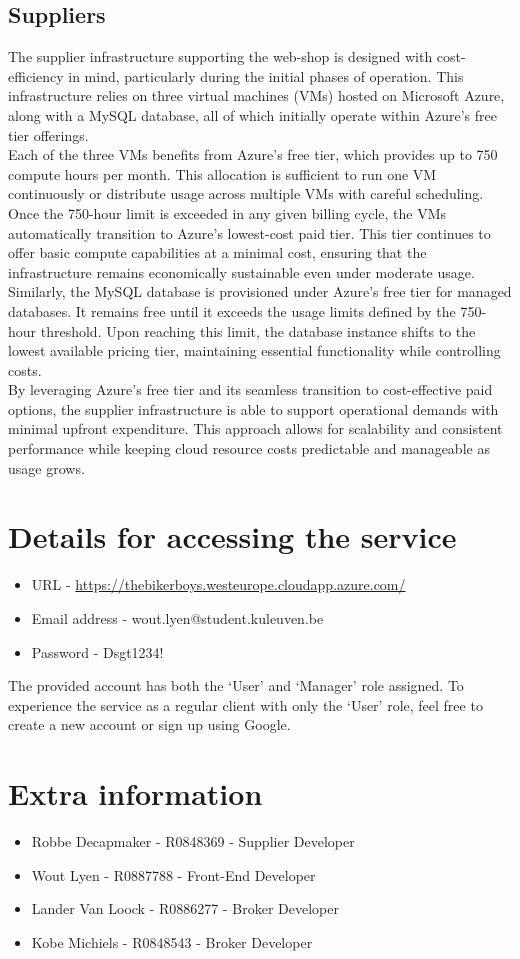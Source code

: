 \documentclass[10pt,a4paper,kul]{kulakarticle} %
\begin{document}
		\subsection{Suppliers}
			The supplier infrastructure supporting the web-shop is designed with cost-efficiency in mind, particularly during the initial phases of operation. This infrastructure relies on three virtual machines (VMs) hosted on Microsoft Azure, along with a MySQL database, all of which initially operate within Azure's free tier offerings.\\
			Each of the three VMs benefits from Azure’s free tier, which provides up to 750 compute hours per month. This allocation is sufficient to run one VM continuously or distribute usage across multiple VMs with careful scheduling. Once the 750-hour limit is exceeded in any given billing cycle, the VMs automatically transition to Azure’s lowest-cost paid tier. This tier continues to offer basic compute capabilities at a minimal cost, ensuring that the infrastructure remains economically sustainable even under moderate usage.\\
			Similarly, the MySQL database is provisioned under Azure’s free tier for managed databases. It remains free until it exceeds the usage limits defined by the 750-hour threshold. Upon reaching this limit, the database instance shifts to the lowest available pricing tier, maintaining essential functionality while controlling costs.\\
			By leveraging Azure’s free tier and its seamless transition to cost-effective paid options, the supplier infrastructure is able to support operational demands with minimal upfront expenditure. This approach allows for scalability and consistent performance while keeping cloud resource costs predictable and manageable as usage grows.
			
	\section{Details for accessing the service}
	
	\begin{itemize}
		\item URL - \url{https://thebikerboys.westeurope.cloudapp.azure.com/}
		\item Email address - wout.lyen@student.kuleuven.be
		\item Password - Dsgt1234!
	\end{itemize}
	
	\noindent The provided account has both the `User' and `Manager' role assigned. To experience the service as a regular client with only the `User' role, feel free to create a new account or sign up using Google.
	
  \section{Extra information}
  \begin{itemize}
    \item Robbe Decapmaker - R0848369 - Supplier Developer
    \item Wout Lyen - R0887788 - Front-End Developer
    \item Lander Van Loock - R0886277 - Broker Developer
    \item Kobe Michiels - R0848543 - Broker Developer
  \end{itemize}
  
\end{document}
